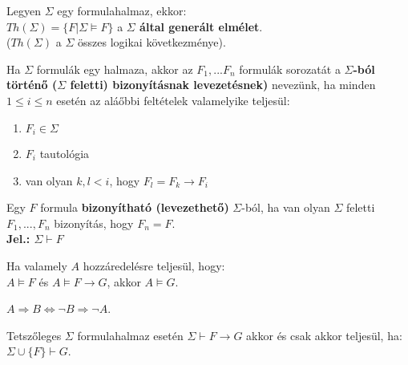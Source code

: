 \begin{frame}

\begin{tcolorbox}[title={Def.: Elmélet}]
Legyen $\Sigma$ egy formulahalmaz, ekkor:\\
\msmallskip
$Th({\Sigma}) = \{F | \Sigma \models F\}$ a \textbf{$\Sigma$ által generált elmélet}.\\
($Th({\Sigma})$ a $\Sigma$ összes logikai következménye).
\end{tcolorbox}

\begin{tcolorbox}[title={Def.: Levezetés, bizonyítható formula}]
Ha $\Sigma$ formulák egy halmaza, akkor az $F_1, ... F_n$ formulák sorozatát a \textbf{$\Sigma$-ból történő ($\Sigma$ feletti) bizonyításnak levezetésnek)} nevezünk, ha minden $1 \leq i \leq n$ esetén az aláőbbi feltételek valamelyike teljesül:\\
\begin{enumerate}
\item $F_i \in \Sigma$
\item $F_i$ tautológia
\item van olyan $k, l < i$, hogy $F_l = F_k \rightarrow F_i$
\end{enumerate}
\mbigskip
Egy $F$ formula \textbf{bizonyítható (levezethető)} $\Sigma$-ból, ha van olyan $\Sigma$ feletti $F_1, ..., F_n$ bizonyítás, hogy $F_n = F$.\\
\mbigskip
\textbf{Jel.: $\Sigma \vdash F$}
\end{tcolorbox}

\end{frame}

\begin{frame}

\begin{tcolorbox}[title={Def.: Modus Ponens}]
Ha valamely $A$ hozzáredelésre teljesül, hogy:\\
$A \models F$ és $A \models F \rightarrow G$, akkor $A \models G$.
\end{tcolorbox}

\begin{tcolorbox}[title={Def.: Modus Tollens (Kontrapozíció)}]
$A \Rightarrow B \iff {\neg}B \Rightarrow {\neg}A$.
\end{tcolorbox}

\begin{tcolorbox}[title={Def.: Indirekt Bizonyítás}]
Tetszőleges $\Sigma$ formulahalmaz esetén $\Sigma \vdash F \rightarrow G$ akkor és csak akkor teljesül, ha:\\
$\Sigma \cup \{F\} \vdash G$.
\end{tcolorbox}

\end{frame}

